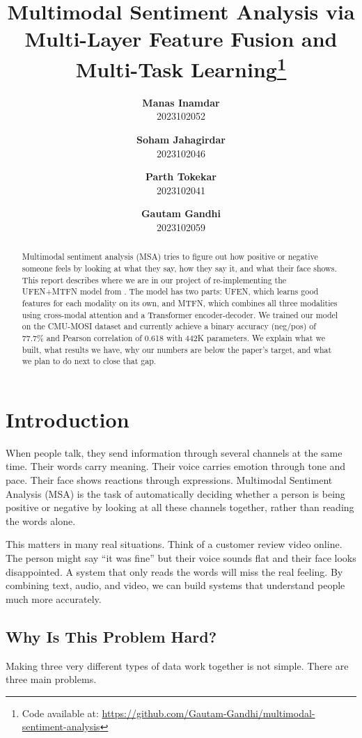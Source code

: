 \documentclass[11pt,twocolumn]{article}
\title{\Large\bf Multimodal Sentiment Analysis via\\[2pt]
Multi-Layer Feature Fusion and Multi-Task Learning\thanks{Code available at: \url{https://github.com/Gautam-Gandhi/multimodal-sentiment-analysis}}}
\author{
  \textbf{Manas Inamdar} \\ 
  2023102052
  \and
  \textbf{Soham Jahagirdar} \\ 
   2023102046
  \and
  \textbf{Parth Tokekar} \\ 
   2023102041
  \and
  \textbf{Gautam Gandhi} \\ 
   2023102059
}
\date{}
\begin{document}
\maketitle

\begin{abstract}
Multimodal sentiment analysis (MSA) tries to figure out how positive or negative someone feels by looking at what they say, how they say it, and what their face shows. This report describes where we are in our project of re-implementing the UFEN+MTFN model from \citet{cai2025multimodal}. The model has two parts: UFEN, which learns good features for each modality on its own, and MTFN, which combines all three modalities using cross-modal attention and a Transformer encoder-decoder. We trained our model on the CMU-MOSI dataset and currently achieve a binary accuracy (neg/pos) of 77.7\% and Pearson correlation of 0.618 with 442K parameters. We explain what we built, what results we have, why our numbers are below the paper's target, and what we plan to do next to close that gap.
\end{abstract}

\section{Introduction}
\label{sec:intro}

When people talk, they send information through several channels at the same time. Their words carry meaning. Their voice carries emotion through tone and pace. Their face shows reactions through expressions. Multimodal Sentiment Analysis (MSA) is the task of automatically deciding whether a person is being positive or negative by looking at all these channels together, rather than reading the words alone.

This matters in many real situations. Think of a customer review video online. The person might say ``it was fine'' but their voice sounds flat and their face looks disappointed. A system that only reads the words will miss the real feeling. By combining text, audio, and video, we can build systems that understand people much more accurately.

\subsection{Why Is This Problem Hard?}

Making three very different types of data work together is not simple. There are three main problems.
\end{document}
